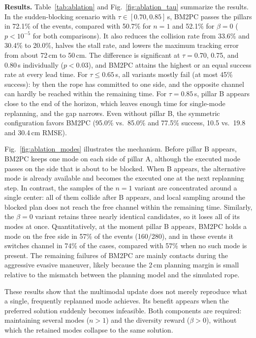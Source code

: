 \textbf{Results.} Table~\ref{tab:ablation} and Fig.~\ref{fig:ablation_tau} summarize the results. In the sudden-blocking scenario with $\tau\in[0.70,0.85]$\,s, BM2PC passes the pillars in 72.1\% of the events, compared with 50.7\% for $n=1$ and 52.1\% for $\beta=0$ ($p<10^{-5}$ for both comparisons). It also reduces the collision rate from 33.6\% and 30.4\% to 20.0\%, halves the stall rate, and lowers the maximum tracking error from about 72\,cm to 50\,cm. The difference is significant at $\tau=0.70$, 0.75, and 0.80\,s individually ($p<0.03$), and BM2PC attains the highest or an equal success rate at every lead time. For $\tau\le0.65$\,s, all variants mostly fail (at most 45\% success): by then the rope has committed to one side, and the opposite channel can hardly be reached within the remaining time. For $\tau=0.85$\,s, pillar B appears close to the end of the horizon, which leaves enough time for single-mode replanning, and the gap narrows. Even without pillar B, the symmetric configuration favors BM2PC (95.0\% vs.\ 85.0\% and 77.5\% success, 10.5 vs.\ 19.8 and 30.4\,cm RMSE).

Fig.~\ref{fig:ablation_modes} illustrates the mechanism. Before pillar B appears, BM2PC keeps one mode on each side of pillar A, although the executed mode passes on the side that is about to be blocked. When B appears, the alternative mode is already available and becomes the executed one at the next replanning step. In contrast, the samples of the $n=1$ variant are concentrated around a single center: all of them collide after B appears, and local sampling around the blocked plan does not reach the free channel within the remaining time. Similarly, the $\beta=0$ variant retains three nearly identical candidates, so it loses all of its modes at once. Quantitatively, at the moment pillar B appears, BM2PC holds a mode on the free side in 57\% of the events (160/280), and in these events it switches channel in 74\% of the cases, compared with 57\% when no such mode is present. The remaining failures of BM2PC are mainly contacts during the aggressive evasive maneuver, likely because the 2\,cm planning margin is small relative to the mismatch between the planning model and the simulated rope.

These results show that the multimodal update does not merely reproduce what a single, frequently replanned mode achieves. Its benefit appears when the preferred solution suddenly becomes infeasible. Both components are required: maintaining several modes ($n>1$) and the diversity reward ($\beta>0$), without which the retained modes collapse to the same solution.
